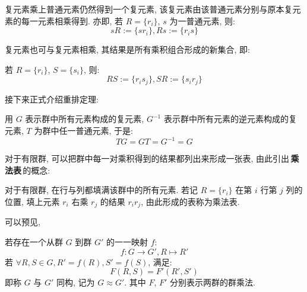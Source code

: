             \begin{Definition}[复元素与普通元素的乘法]
                复元素乘上普通元素仍然得到一个复元素, 该复元素由该普通元素分别与原本复元素的每一元素相乘得到. 亦即, 若 $R = \{r_i\}$, $s$ 为一普通元素, 则:
                    \begin{equation}
                        sR := \{s r_i\}, Rs:= \{r_i s\}
                    \end{equation}
            \end{Definition}

        复元素也可与复元素相乘, 其结果是所有乘积组合形成的新集合, 即:

            \begin{Definition}[复元素与复元素相乘]
                若 $R = \{r_i\}$, $S = \{s_i\}$, 则:
                    \begin{equation}
                        RS := \{r_i s_j\}, SR := \{s_i r_j\}
                    \end{equation}
            \end{Definition}

        接下来正式介绍重排定理:

            \begin{Theorem}[重排定理]
                用 $G$ 表示群中所有元素构成的复元素, $G^{-1}$ 表示群中所有元素的逆元素构成的复元素, $T$ 为群中任一普通元素, 于是:
                    \begin{equation}
                        TG = GT = G^{-1} = G
                    \end{equation}
            \end{Theorem}

        \hspace*{2em}对于有限群, 可以把群中每一对乘积得到的结果都列出来形成一张表, 由此引出\,\textbf{乘法表}\,的概念:

            \begin{Concept}[乘法表]
                对于有限群, 在行与列都填满该群中的所有元素. 若记 $R = \{r_i\}$ 在第 $i$ 行第 $j$ 列的位置, 填上元素 $r_i$ 右乘 $r_j$ 的结果 $r_i r_j$, 由此形成的表称为乘法表.
            \end{Concept}

        可以预见, 

        \begin{Definition}[群的同构]
            若存在一个从群 $G$ 到群 $G'$ 的一一映射 $f$:
                \begin{equation}
                    f: G \to G', R \mapsto R'
                \end{equation}
            若 $\forall R, S \in G, R' = f(R), S' = f(S)$, 满足:
                \begin{equation}
                    F(R, S) = F'(R', S')
                \end{equation}
            即称 $G$ 与 $G'$ 同构, 记为 $G \approx G'$. 其中 $F$, $F'$ 分别表示两群的群乘法.
        \end{Definition}

